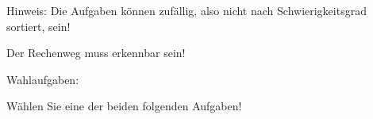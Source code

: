\documentclass[12pt,pdftex]{article}
\begin{document}

{
	\addtocounter{jkci}{1}  %
	\chead{\thejkci\,(\sSID) - \sVN \,  \sNN \, - \sKlasse}
	\setcounter{jkaufgabe}{0}
Hinweis: Die Aufgaben können zufällig, also nicht nach Schwierigkeitsgrad sortiert, sein!


Der Rechenweg muss erkennbar sein! 

\par\bigskip
%	
	
\par\bigskip
	
\par\bigskip
	
\par\bigskip
	
\par\bigskip
\newpage
	
\par\bigskip
	
\par\bigskip
	
\par\bigskip
	
\par\bigskip
	
\newpage
	
\par\bigskip
	

\newpage
{\Huge Wahlaufgaben: }\par
Wählen Sie eine der beiden folgenden Aufgaben!
\par\bigskip
	
\par\bigskip
	

\newpage
%	
%    
\newpage
}	
\end{document}
